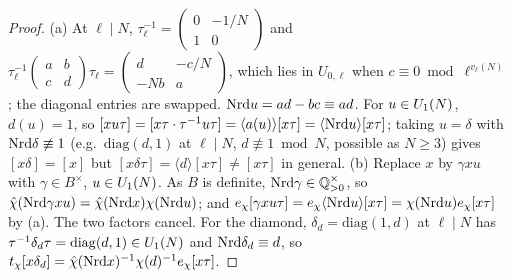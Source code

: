 \begin{proof}
(a) At $\ell\mid N$, $\tau_\ell^{-1}=\left(\begin{smallmatrix}0&-1/N\\1&0\end{smallmatrix}\right)$ and
$\tau_\ell^{-1}\left(\begin{smallmatrix}a&b\\c&d\end{smallmatrix}\right)\tau_\ell=\left(\begin{smallmatrix}d&-c/N\\-Nb&a\end{smallmatrix}\right)$, which lies in
$U_{0,\ell}$ when $c\equiv0\bmod\ell^{v_\ell(N)}$; the diagonal entries are swapped. $\mathrm{Nrd} u=ad-bc\equiv ad$. For $u\in U_1(N)$, $d(u)=1$, so
$[xu\tau]=[x\tau\cdot\tau^{-1}u\tau]=\langle a(u)\rangle[x\tau]=\langle\mathrm{Nrd} u\rangle[x\tau]$; taking $u=\delta$ with $\mathrm{Nrd}\delta\not\equiv1$ (e.g.\ $\mathrm{diag}(d,1)$
at $\ell\mid N$, $d\not\equiv1\bmod N$, possible as $N\ge3$) gives $[x\delta]=[x]$ but $[x\delta\tau]=\langle d\rangle[x\tau]\ne[x\tau]$ in general.
(b) Replace $x$ by $\gamma xu$ with $\gamma\in B^\times$, $u\in U_1(N)$. As $B$ is definite, $\mathrm{Nrd}\gamma\in\mathbb{Q}^\times_{>0}$, so $\hat\chi(\mathrm{Nrd}\gamma xu)=\hat\chi(\mathrm{Nrd} x)\chi(\mathrm{Nrd} u)$;
and $e_\chi[\gamma xu\tau]=e_\chi\langle\mathrm{Nrd} u\rangle[x\tau]=\chi(\mathrm{Nrd} u)e_\chi[x\tau]$ by (a). The two factors cancel. For the diamond, $\delta_d=\mathrm{diag}(1,d)$ at
$\ell\mid N$ has $\tau^{-1}\delta_d\tau=\mathrm{diag}(d,1)\in U_1(N)$ and $\mathrm{Nrd}\delta_d\equiv d$, so $t_\chi[x\delta_d]=\hat\chi(\mathrm{Nrd} x)^{-1}\chi(d)^{-1}e_\chi[x\tau]$.
\end{proof}

